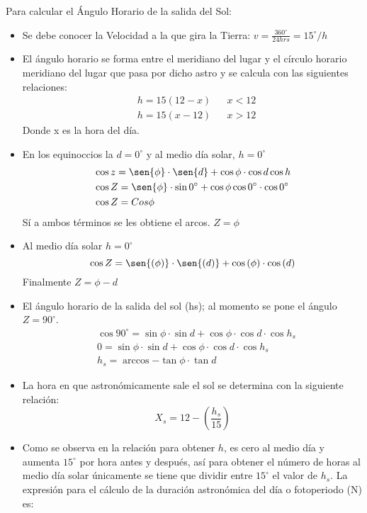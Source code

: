 Para calcular el Ángulo Horario de la salida del Sol:
\begin{itemize}
    \item Se debe conocer la Velocidad a la que gira la Tierra: $v=\frac{360^{\circ}}{24hrs}=15^{\circ}/h$
    \item El ángulo horario se forma entre el meridiano del lugar y el círculo horario meridiano del lugar que pasa por dicho astro y se calcula con las siguientes relaciones:
    \begin{align*}
        &h=15\left(12- x\right)&&x < 12\\
        &h=15\left(x -12\right)&&x > 12
    \end{align*}
    Donde x es la hora del día.
    \item En los equinoccios la $d = 0^{\circ}$ y al medio día solar, $h = 0^{\circ}$ 
    \begin{align}
        &\cos{z} = \sen{\phi} \cdot \sen{d} + \cos{\phi} \cdot \cos{d} \cos{h}\\
        &\cos{Z}= \sen{\phi} \cdot \sin{ 0^{\circ}} + \cos{\phi} \cos{0^{\circ}} \cdot \cos0^{\circ}\\
        &\cos{Z} = Cos{\phi}
    \end{align}
    Sí a ambos términos se les obtiene el arcos. $Z=\phi$
    \item Al medio día solar $h=0^{\circ}$ \begin{equation}
        \cos{Z}= \sen{(\phi)} \cdot \sen{(d)} + \cos{(\phi)} \cdot \cos{(d)}
    \end{equation}
    Finalmente $Z=\phi-d$
    \item El ángulo horario de la salida del sol (hs); al momento se pone el ángulo $Z= 90^{\circ}$.
    \begin{align}
        & \cos{90^{\circ}} = \sin{\phi} \cdot \sin{d} + \cos{\phi} \cdot \cos{d} \cdot \cos{h_s}\\
        & 0 = \sin{\phi} \cdot \sin{d} + \cos{\phi} \cdot \cos{d} \cdot \cos{h_s}\\
        & h_s = \arccos{ -\tan{\phi} \cdot \tan{d}} 
    \end{align}
    \item La hora en que astronómicamente sale el sol se determina con la siguiente relación:
    \begin{equation}
        X_s = 12 - \left(\frac{h_s}{15}\right)
    \end{equation}
    \item Como se observa en la relación para obtener $h$, es cero al medio día y aumenta $15^{\circ}$ por hora antes y después, así para obtener el número de horas al medio día solar únicamente se tiene que dividir entre $15^{\circ}$ el valor de $h_s$. La expresión para el cálculo de la duración astronómica del día o fotoperiodo (N) es:    

\end{itemize}
